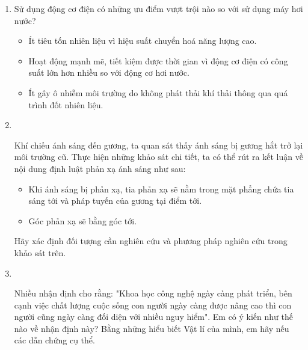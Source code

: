 \begin{enumerate}[label=\bfseries Câu \arabic*:,leftmargin=1.5cm]
	\item {}
	
	
	{
		Sử dụng động cơ điện có những ưu điểm vượt trội nào so với sử dụng máy hơi nước?
	}
	
	\hideall
	{	\begin{itemize}
			\item Ít tiêu tốn nhiên liệu vì hiệu suất chuyển hoá năng lượng cao.
			\item Hoạt động mạnh mẽ, tiết kiệm được thời gian vì động cơ điện có công suất lớn hơn nhiều so với động cơ hơi nước.
			\item Ít gây ô nhiễm môi trường do không phát thải khí thải thông qua quá trình đốt nhiên liệu.
		\end{itemize}
	}
	
	\item {}\\
	{Khí chiếu ánh sáng đến gương, ta quan sát thấy ánh sáng bị gương hắt trở lại môi trường cũ. Thực hiện những khảo sát chi tiết, ta có thể rút ra kết luận về nội dung định luật phản xạ ánh sáng như sau:
		\begin{itemize}
			\item Khi ánh sáng bị phản xạ, tia phản xạ sẽ nằm trong mặt phẳng chứa tia sáng tới và pháp tuyến của gương tại điểm tới.
			\item Góc phản xạ sẽ bằng góc tới.
		\end{itemize}
	Hãy xác định đối tượng cần nghiên cứu và phương pháp nghiên cứu trong khảo sát trên.
}
	
	\item {}\\
	{Nhiều nhận định cho rằng: "Khoa học công nghệ ngày càng phát triển, bên cạnh việc chất lượng cuộc sống con người ngày càng được nâng cao thì con người cũng ngày càng đối diện với nhiều nguy hiểm". Em có ý kiến như thế nào về nhận định này? Bằng những hiểu biết Vật lí của mình, em hãy nếu các dẫn chứng cụ thể.
	
}
	

\end{enumerate}
